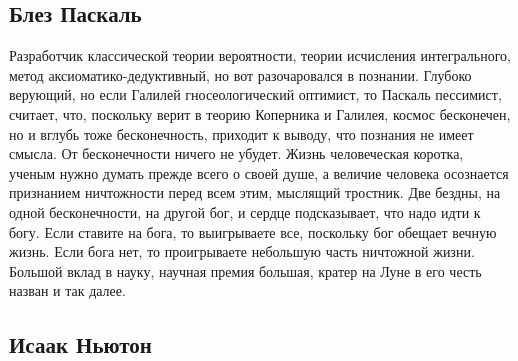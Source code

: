 \documentclass[a4paper, 12pt]{article}
\begin{document}

\subsection{Блез Паскаль}

Разработчик классической теории вероятности, теории исчисления 
интегрального, метод аксиоматико-дедуктивный, но вот разочаровался 
в познании. Глубоко верующий, но если Галилей гносеологический оптимист, 
то Паскаль пессимист, считает, что, поскольку верит в теорию Коперника 
и Галилея, космос бесконечен, но и вглубь тоже бесконечность, приходит 
к выводу, что познания не имеет смысла. От бесконечности ничего не 
убудет. Жизнь человеческая коротка, ученым нужно думать прежде всего 
о своей душе, а величие человека осознается признанием ничтожности перед 
всем этим, мыслящий тростник. Две бездны, на одной бесконечности, на 
другой бог, и сердце подсказывает, что надо идти к богу. Если ставите на 
бога, то выигрываете все, поскольку бог обещает вечную жизнь. Если бога 
нет, то проигрываете небольшую часть ничтожной жизни. Большой вклад 
в науку, научная премия большая, кратер на Луне в его честь назван и так 
далее.


\subsection{Исаак Ньютон}
\end{document}
